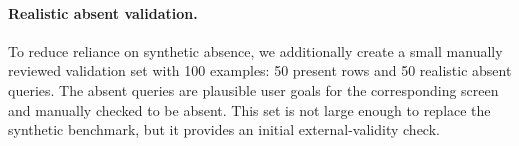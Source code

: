 \paragraph{Realistic absent validation.}
To reduce reliance on synthetic absence, we additionally create a small manually reviewed validation set with 100 examples: 50 present rows and 50 realistic absent queries. The absent queries are plausible user goals for the corresponding screen and manually checked to be absent. This set is not large enough to replace the synthetic benchmark, but it provides an initial external-validity check.
